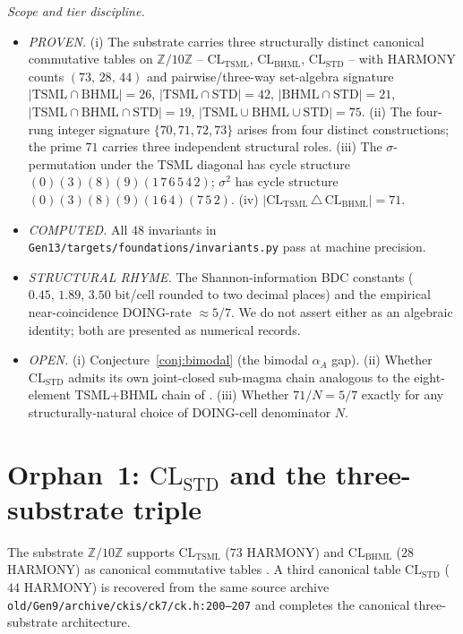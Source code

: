 \documentclass[11pt,reqno]{amsart}
\theoremstyle{plain}
\theoremstyle{definition}
\theoremstyle{remark}
\newcommand{\Z}{\mathbb{Z}}
\newcommand{\TSML}{\mathrm{TSML}}
\newcommand{\BHML}{\mathrm{BHML}}
\newcommand{\STD}{\mathrm{STD}}
\begin{document}
\noindent\emph{Scope and tier discipline.}
\begin{itemize}
\item \emph{PROVEN.} (i) The substrate carries three structurally
distinct canonical commutative tables on $\Z/10\Z$ -- $\mathrm{CL}_\TSML$,
$\mathrm{CL}_\BHML$, $\mathrm{CL}_\STD$ -- with HARMONY counts
$(73,\,28,\,44)$ and pairwise/three-way set-algebra signature
$|\TSML\cap\BHML|=26$, $|\TSML\cap\STD|=42$, $|\BHML\cap\STD|=21$,
$|\TSML\cap\BHML\cap\STD|=19$, $|\TSML\cup\BHML\cup\STD|=75$.
(ii) The four-rung integer signature $\{70,71,72,73\}$ arises from
four distinct constructions; the prime $71$ carries three independent
structural roles. (iii) The $\sigma$-permutation under the
$\TSML$ diagonal has cycle structure
$(0)(3)(8)(9)(1\,7\,6\,5\,4\,2)$; $\sigma^2$ has cycle structure
$(0)(3)(8)(9)(1\,6\,4)(7\,5\,2)$. (iv) $|\mathrm{CL}_\TSML \,\triangle\,
\mathrm{CL}_\BHML|=71$.
\item \emph{COMPUTED.} All $48$ invariants in
\texttt{Gen13/targets/foundations/invariants.py}
\cite{FoundationsModule} pass at machine precision.
\item \emph{STRUCTURAL RHYME.} The Shannon-information BDC constants
($0.45,\,1.89,\,3.50$ bit/cell rounded to two decimal places) and the
empirical near-coincidence DOING-rate $\approx 5/7$. We do not assert
either as an algebraic identity; both are presented as numerical
records.
\item \emph{OPEN.} (i) Conjecture~\ref{conj:bimodal} (the bimodal
$\alpha_A$ gap). (ii) Whether $\mathrm{CL}_\STD$ admits its own
joint-closed sub-magma chain analogous to the eight-element
TSML+BHML chain of \cite{SandersGishFourCore}. (iii) Whether
$71/N = 5/7$ exactly for any structurally-natural choice of
DOING-cell denominator $N$.
\end{itemize}

\section{Orphan~1: $\mathrm{CL}_\STD$ and the three-substrate triple}
\label{sec:std}

The substrate $\Z/10\Z$ supports $\mathrm{CL}_\TSML$ ($73$ HARMONY)
and $\mathrm{CL}_\BHML$ ($28$ HARMONY) as canonical commutative
tables \cite{SandersForcing,SandersGishFourCore}. A third canonical
table $\mathrm{CL}_\STD$ ($44$ HARMONY) is recovered from the same
source archive \texttt{old/Gen9/archive/ckis/ck7/ck.h:200--207} and
completes the canonical three-substrate architecture.
\end{document}
